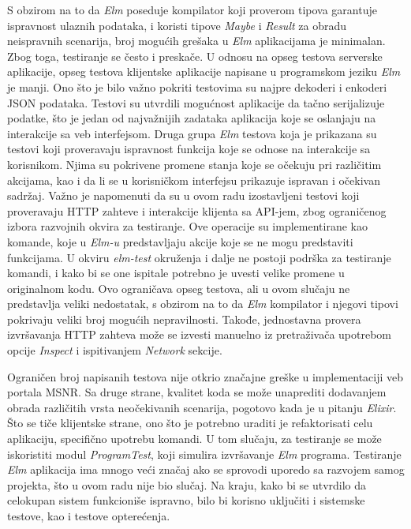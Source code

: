 \documentclass[12pt,oneside]{memoir}
\begin{document}
\par S obzirom na to da \emph{Elm} poseduje kompilator koji proverom tipova garantuje ispravnost ulaznih podataka, i koristi tipove \emph{Maybe} i \emph{Result} za obradu neispravnih scenarija, broj mogućih grešaka u \emph{Elm} aplikacijama je minimalan. Zbog toga, testiranje se često i preskače. U odnosu na opseg testova serverske aplikacije, opseg testova klijentske aplikacije napisane u programskom jeziku \emph{Elm} je manji. Ono što je bilo važno pokriti testovima su najpre dekoderi i enkoderi JSON podataka. Testovi su utvrdili mogućnost aplikacije da tačno serijalizuje podatke, što je jedan od najvažnijih zadataka aplikacija koje se oslanjaju na interakcije sa veb interfejsom. Druga grupa \emph{Elm} testova koja je prikazana su testovi koji proveravaju ispravnost funkcija koje se odnose na interakcije sa korisnikom. Njima su pokrivene promene stanja koje se očekuju pri različitim akcijama, kao i da li se u korisničkom interfejsu prikazuje ispravan i očekivan sadržaj. Važno je napomenuti da su u ovom radu izostavljeni testovi koji proveravaju HTTP zahteve i interakcije klijenta sa API-jem, zbog ograničenog izbora razvojnih okvira za testiranje. Ove operacije su implementirane kao komande, koje u \emph{Elm-u} predstavljaju akcije koje se ne mogu predstaviti funkcijama. U okviru \emph{elm-test} okruženja i dalje ne postoji podrška za testiranje komandi, i kako bi se one ispitale potrebno je uvesti velike promene u originalnom kodu. Ovo ograničava opseg testova, ali u ovom slučaju ne predstavlja veliki nedostatak, s obzirom na to da \emph{Elm} kompilator i njegovi tipovi pokrivaju veliki broj mogućih nepravilnosti. Takođe, jednostavna provera izvršavanja HTTP zahteva može se izvesti manuelno iz pretraživača upotrebom opcije \emph{Inspect} i ispitivanjem \emph{Network} sekcije. 
\par Ograničen broj napisanih testova nije otkrio značajne greške u implementaciji veb portala MSNR. Sa druge strane, kvalitet koda se može unaprediti dodavanjem obrada različitih vrsta neočekivanih scenarija, pogotovo kada je u pitanju \emph{Elixir}. Što se tiče klijentske strane, ono što je potrebno uraditi je refaktorisati celu aplikaciju, specifično upotrebu komandi. U tom slučaju, za testiranje se može iskoristiti modul \emph{ProgramTest}, koji simulira izvršavanje \emph{Elm} programa. Testiranje \emph{Elm} aplikacija ima mnogo veći značaj ako se sprovodi uporedo sa razvojem samog projekta, što u ovom radu nije bio slučaj. Na kraju, kako bi se utvrdilo da celokupan sistem funkcioniše ispravno, bilo bi korisno uključiti i sistemske testove, kao i testove opterećenja.
\par 
\end{document}
